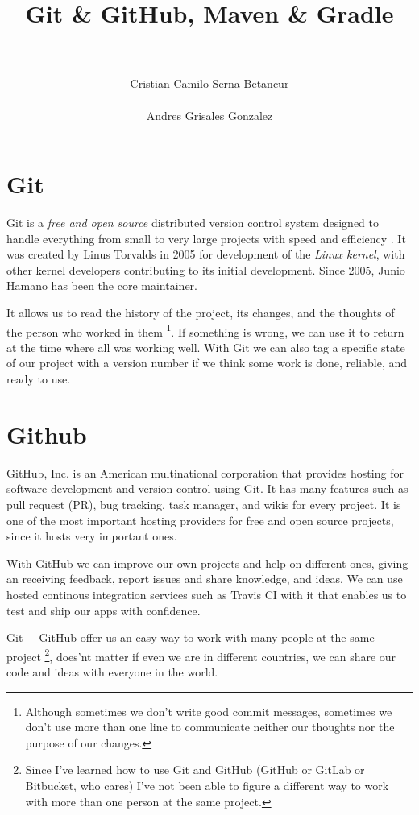 \documentclass[a4paper,11pt]{article}
\title{Git \& GitHub, Maven \& Gradle}
\author{\\\\ Cristian Camilo Serna Betancur \\\\ Andres Grisales Gonzalez}
\begin{document}
\maketitle
\tableofcontents

\section{Git}
Git is a \emph{free and open source} distributed version control system designed 
to handle everything from small to very large projects with speed and efficiency
\cite{git}. It was created by Linus Torvalds in 2005 for development of the 
\emph{Linux kernel}, with other kernel developers contributing to its initial 
development. Since 2005, Junio Hamano has been the core maintainer\cite{gita}.

It allows us to read the history of the project, its changes, and the thoughts 
of the person who worked in them \footnote{Although sometimes we don't write 
good commit messages, sometimes we don't use more than one line to communicate 
neither our thoughts nor the purpose of our changes.}. If something is wrong, 
we can use it to return at the time where all was working well. With Git we can 
also tag a specific state of our project with a version number if we think some 
work is done, reliable, and ready to use.

\section{Github}
GitHub, Inc. is an American multinational corporation that provides hosting for 
software development and version control using Git\cite{github}. It has many 
features such as pull request (PR), bug tracking, task manager, and wikis for 
every project. It is one of the most important hosting providers for free and 
open source projects, since it hosts very important ones.

With GitHub we can improve our own projects and help on different ones, giving 
an receiving feedback, report issues and share knowledge, and ideas. We can use
hosted continous integration services such as Travis CI with it that enables us
to test and ship our apps with confidence\cite{travis}.

Git $+$ GitHub offer us an easy way to work with many people at the same project
\footnote{Since I've learned how to use Git and GitHub (GitHub or GitLab or 
Bitbucket, who cares) I've not been able to figure a different way to work with 
more than one person at the same project.}, does'nt matter if even we are in 
different countries, we can share our code and ideas with everyone in the world.
\end{document}
